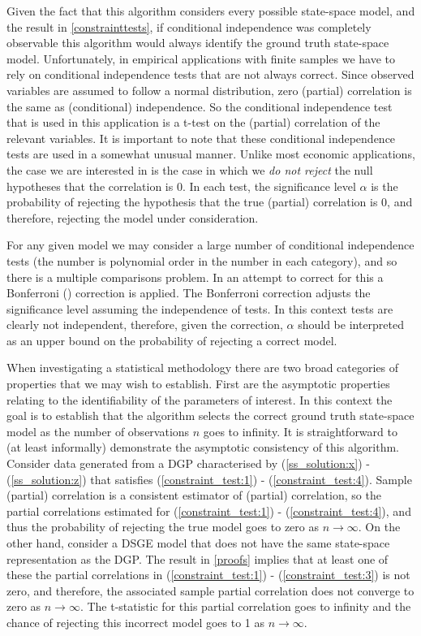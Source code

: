 \documentclass{article}
\begin{document}
Given the fact that this algorithm considers every possible state-space model, and the result in \ref{constrainttests}, if conditional independence was completely observable this algorithm would always identify the ground truth state-space model. Unfortunately, in empirical applications with finite samples we have to rely on conditional independence tests that are not always correct. Since observed variables are assumed to follow a normal distribution, zero (partial) correlation is the same as (conditional) independence. So the conditional independence test that is used in this application is a t-test on the (partial) correlation of the relevant variables. It is important to note that these conditional independence tests are used in a somewhat unusual manner. Unlike most economic applications, the case we are interested in is the case in which we \textit{do not reject} the null hypotheses that the correlation is 0. In each test, the significance level $\alpha$ is the probability of rejecting the hypothesis that the true (partial) correlation is 0, and therefore, rejecting the model under consideration. 

For any given model we may consider a large number of conditional independence tests (the number is polynomial order in the number in each category), and so there is a multiple comparisons problem. In an attempt to correct for this a Bonferroni (\citeyear{bonferroni1936teoria}) correction is applied. The Bonferroni correction adjusts the significance level assuming the independence of tests. In this context tests are clearly not independent, therefore, given the correction, $\alpha$ should be interpreted as an upper bound on the probability of rejecting a correct model.

When investigating a statistical methodology there are two broad categories of properties that we may wish to establish. First are the asymptotic properties relating to the identifiability of the parameters of interest. In this context the goal is to establish that the algorithm selects the correct ground truth state-space model as the number of observations $n$ goes to infinity. It is straightforward to (at least informally) demonstrate the asymptotic consistency of this algorithm. Consider data generated from a DGP characterised by (\ref{ss_solution:x}) - (\ref{ss_solution:z}) that satisfies (\ref{constraint_test:1}) - (\ref{constraint_test:4}). Sample (partial) correlation is a consistent estimator of (partial) correlation, so the partial correlations estimated for (\ref{constraint_test:1}) - (\ref{constraint_test:4}), and thus the probability of rejecting the true model goes to zero as $n \rightarrow \infty$. On the other hand, consider a DSGE model that does not have the same state-space representation as the DGP. The result in \ref{proofs} implies that at least one of these the partial correlations in (\ref{constraint_test:1}) - (\ref{constraint_test:3}) is not zero, and therefore, the associated sample partial correlation does not converge to zero as $n \rightarrow \infty$. The t-statistic for this partial correlation goes to infinity and the chance of rejecting this incorrect model goes to 1 as $n \rightarrow \infty$.
\end{document}
